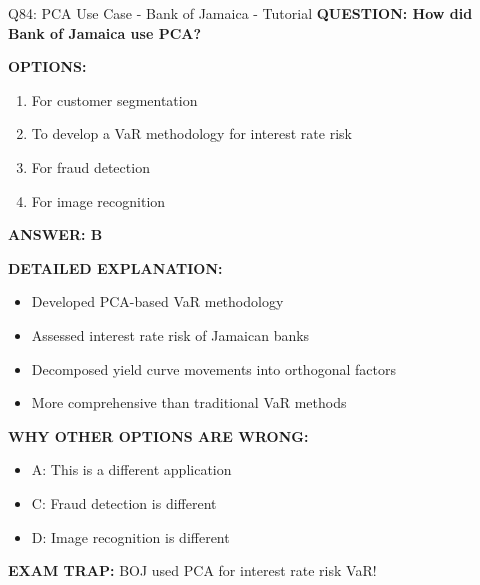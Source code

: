 \documentclass[8pt]{beamer}
\begin{document}
	\begin{frame}{Q84: PCA Use Case - Bank of Jamaica - Tutorial}
		\fontsize{6.5}{7.5}\selectfont
		\textbf{QUESTION: How did Bank of Jamaica use PCA?}
		
		\vspace{0.1cm}
		\textbf{OPTIONS:}
		\begin{enumerate}
			\item For customer segmentation
			\item To develop a VaR methodology for interest rate risk
			\item For fraud detection
			\item For image recognition
		\end{enumerate}
		
		\vspace{0.1cm}
		\textcolor{myblue}{\textbf{ANSWER: B}}
		
		\vspace{0.1cm}
		\textbf{DETAILED EXPLANATION:}
		\begin{itemize}
			\item Developed PCA-based VaR methodology
			\item Assessed interest rate risk of Jamaican banks
			\item Decomposed yield curve movements into orthogonal factors
			\item More comprehensive than traditional VaR methods
		\end{itemize}
		
		\vspace{0.1cm}
		\textcolor{myred}{\textbf{WHY OTHER OPTIONS ARE WRONG:}}
		\begin{itemize}
			\item \textcolor{myred}{A:} This is a different application
			\item \textcolor{myred}{C:} Fraud detection is different
			\item \textcolor{myred}{D:} Image recognition is different
		\end{itemize}
		
		\textcolor{myred}{\textbf{EXAM TRAP:}} BOJ used PCA for \textcolor{myblue}{interest rate risk VaR}!
	\end{frame}
	
\end{document}
